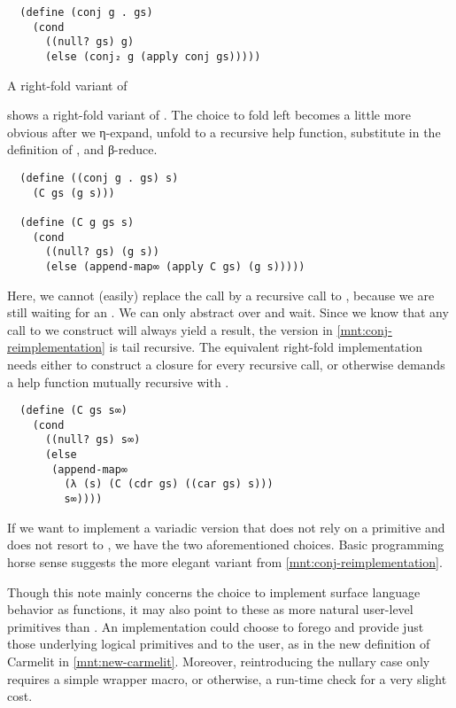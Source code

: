 \documentclass[sigplan,draft,balance,pbalance,natbib=false]{acmart}
\begin{document}
\begin{listing}[h]
\begin{verbatim}
  (define (conj g . gs)
    (cond
      ((null? gs) g)
      (else (conj₂ g (apply conj gs)))))
\end{verbatim}
  \caption{A right-fold variant of }
  \label{mnt:conj-right-fold-definition}
\end{listing}

 shows a right-fold variant of
. The choice to fold left becomes a little more
obvious after we η-expand, unfold to a recursive help function,
substitute in the definition of , and β-reduce.

\begin{verbatim}
  (define ((conj g . gs) s)
    (C gs (g s)))

  (define (C g gs s)
    (cond
      ((null? gs) (g s))
      (else (append-map∞ (apply C gs) (g s)))))
\end{verbatim}

\noindent Here, we cannot (easily) replace the  call
by a recursive call to , because we are still waiting
for an . We can only abstract over  and
wait. Since we know that any call to  we
construct will always yield a result, the version in
\cref{mnt:conj-reimplementation} is tail recursive. The equivalent
right-fold implementation needs either to construct a closure for
every recursive call, or otherwise demands a help function mutually
recursive with .

\begin{verbatim}
  (define (C gs s∞)
    (cond
      ((null? gs) s∞)
      (else
       (append-map∞
         (λ (s) (C (cdr gs) ((car gs) s)))
         s∞))))
\end{verbatim}

If we want to implement a variadic version that does not rely on a
primitive  and does not resort to
, we have the two aforementioned choices. Basic
programming horse sense suggests the more elegant variant from
\cref{mnt:conj-reimplementation}.

Though this note mainly concerns the choice to implement surface
language behavior as functions, it may also point to these as more
natural user-level primitives than . An
implementation could choose to forego  and provide
just those underlying logical primitives  and
 to the user, as in the new definition of Carmelit in
\cref{mnt:new-carmelit}. Moreover, reintroducing the nullary case only
requires a simple wrapper macro, or otherwise, a run-time
 check for a very slight cost.
\end{document}
